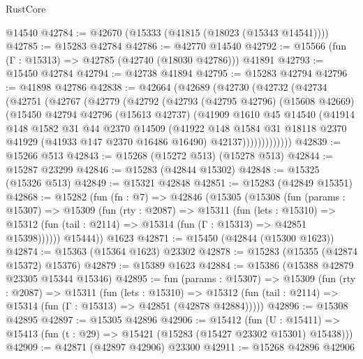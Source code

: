 \begin{lexlean}{RustCore}
\begin{coremodule}
    @14540
@42784 := @42670 (@15333 (@41815 (@18023 (@15343 @14541))))
@42785 := @15283 @42784
@42786 := @42770 @14540
@42792 := @15566 (fun (Γ : @15313) => @42785 (@42740 (@18030 @42786))) @41891
@42793 := @15450 @42784
@42794 := @42738 @41894
@42795 := @15283 @42794
@42796 := @41898 @42786
@42838 := @42664
    (@42689
      (@42730
        (@42732
          (@42734
            (@42751
              (@42767
                (@42779
                  (@42792
                    (@42793
                      (@42795 @42796)
                      (@15608 @42669)
                      (@15450
                        @42794
                        @42796
                        (@15613 @42737)
                        (@41909
                          @1610
                          @45
                          @14540
                          (@41914
                            @148
                            @1582
                            @31
                            @44
                            @2370
                            @14509
                            (@41922
                              @148
                              @1584
                              @31
                              @18118
                              @2370
                              @41929
                              (@41933 @147 @2370 @16486 @16490)
                              @42137)))))))))))))
@42839 := @15266 @513
@42843 := @15268 (@15272 @513) (@15278 @513)
@42844 := @15287 @23299
@42846 := @15283 (@42844 @15302)
@42848 := @15325 (@15326 @513)
@42849 := @15321 @42848
@42851 := @15283 (@42849 @15351)
@42868 := @15282
    (fun (fn : @7) =>
    @42846
      (@15305
        (@15308
          (fun (params : @15307) =>
          @15309
            (fun (rty : @2087) =>
            @15311
              (fun (lets : @15310) =>
              @15312 (fun (tail : @2114) => @15314 (fun (Γ : @15313) => @42851 @15398))))))
        @15444))
    @1623
@42871 := @15450 (@42844 (@15300 @1623))
@42874 := @15363 (@15364 @1623) @23302
@42878 := @15283 (@15355 (@42874 @15372) @15376)
@42879 := @15389 @1623
@42884 := @15386 (@15388 @42879 @23305 @15344 @15346)
@42895 := fun (params : @15307) =>
  @15309
    (fun (rty : @2087) =>
    @15311
      (fun (lets : @15310) =>
      @15312 (fun (tail : @2114) => @15314 (fun (Γ : @15313) => @42851 (@42878 @42884)))))
@42896 := @15308 @42895
@42897 := @15305 @42896
@42906 := @15412
    (fun (U : @15411) => @15413 (fun (t : @29) => @15421 (@15283 (@15427 @23302 @15301) @15438)))
@42909 := @42871 (@42897 @42906) @23300
@42911 := @15268 @42896 @42906

\end{coremodule}
\end{lexlean}
